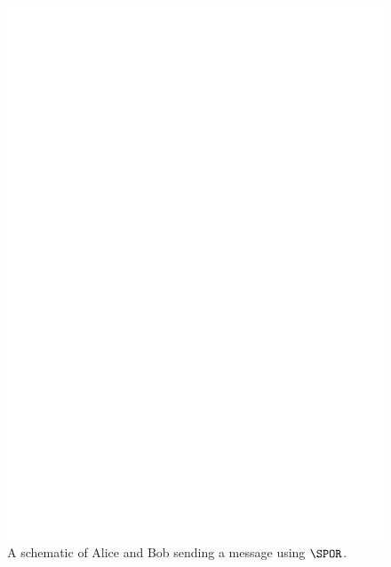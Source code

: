 




 



\begin{figure}
  \includegraphics[width=\linewidth]{figures/file_exchange.pdf}
  \caption{\label{fig:file-exchange}%
    A schematic of Alice and Bob sending a message using \(\SPOR\).
  }
\end{figure}

